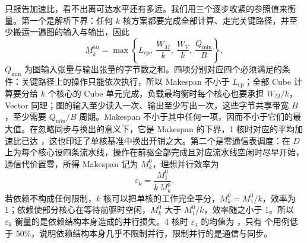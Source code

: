 只报告加速比，看不出离可达水平还有多远。我们用三个逐步收紧的参照值来衡量。第一个是解析下界：任何 $k$ 核方案都要完成全部计算、走完关键路径，并至少搬运一遍图的输入与输出，因此
\begin{equation}
  \underline{M}_k^{\mathrm{an}}=\max\left\{L_{\mathrm{cp}},\ \frac{W_M}{k},\ \frac{W_V}{k},\ \frac{Q_{\min}}{B}\right\},
  \label{eq:lb-analytic}
\end{equation}
$Q_{\min}$ 为图输入张量与输出张量的字节数之和。四项分别对应四个必须满足的条件：关键路径上的操作只能依次执行，所以 Makespan 不小于 $L_{\mathrm{cp}}$；全部 Cube 计算要分给 $k$ 个核心的 Cube 单元完成，负载最均衡时每个核心也要承担 $W_M/k$，Vector 同理；图的输入至少读入一次、输出至少写出一次，这些字节共享带宽 $B$，至少需要 $Q_{\min}/B$ 周期。Makespan 不小于其中任何一项，因而不小于它们的最大值。在忽略同步与换出的意义下，它是 Makespan 的下界，1 核时对应的平均加速比已达 ，这也印证了单核基准中换出开销之大。第二个是零通信表调度：在 $D$ 上为每个核心设四条流水线，操作在前驱全部完成且对应流水线空闲时尽早开始，通信代价置零，所得 Makespan 记为 $M_k^0$，理想并行效率为
\begin{equation}
  \varepsilon_k=\frac{M_1^{0}}{k\,M_k^{0}}.
  \label{eq:ideal-eff}
\end{equation}
若依赖不构成任何限制，$k$ 核可以把单核的工作完全平分，$M_k^0=M_1^0/k$，效率为 1；依赖使部分核心在等待前驱时空闲，$M_k^0$ 大于 $M_1^0/k$，效率随之小于 1。所以 $\varepsilon_k$ 衡量的是依赖结构本身造成的并行损失。4 核时 $\varepsilon_4$ 的均值为 ，只有  个用例低于 50\%，说明依赖结构本身几乎不限制并行，限制并行的是通信与同步。

